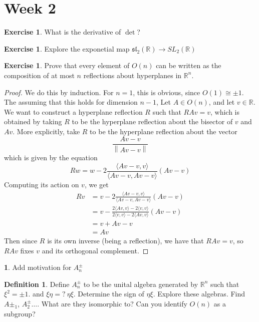 \documentclass[psamsfonts]{amsart}
\theoremstyle{definition}
\newtheorem{defn}[thm]{Definition}
\newtheorem{exer}[thm]{Exercise}
\newtheorem*{TODO}{\ib{TODO}}
\theoremstyle{remark}
\newcommand{\R}{\mathbb{R}}
\newcommand{\ib}[1]{\textbf{\textit{#1}}}
\newcommand{\norm}[1]{\left\lVert#1\right\rVert}
\begin{document}
\section*{Week 2}
\begin{exer}
What is the derivative of $\det$?
\end{exer}
%
\begin{exer}
Explore the exponetial map $\mathfrak{sl}_2(\R) \to SL_2(\R)$
\end{exer}
%
\begin{exer}
Prove that every element of $O(n)$ can be written as the composition of at most $n$ reflections about hyperplanes in $\R^n$.
\end{exer}
%
\begin{proof}
We do this by induction. For $n = 1$, this is obvious, since $O(1) \cong \pm 1$. The assuming that this holds for dimension $n-1$, Let $A \in O(n)$, and let $v \in \R$. We want to construct a hyperplane reflection $R$ such that $RAv = v$, which is obtained by taking $R$ to be the hyperplane reflection about the bisector of $v$ and $Av$. More explicitly, take $R$ to be the hyperplane reflection about the vector 
$$\frac{Av - v}{\norm{Av - v}} $$
which is given by the equation
$$Rw = w - 2 \frac{\langle Av - v, v \rangle}{\langle Av - v, Av - v \rangle}(Av - v) $$
Computing its action on $v$, we get 
\begin{align*}
Rv &= v - 2 \frac{\langle Av - v, v \rangle}{\langle Av - v, Av - v \rangle}(Av - v) \\
&= v - \frac{2\langle Av, v \rangle - 2\langle v, v \rangle}{2 \langle v, v \rangle - 2 \langle Av, v \rangle}(Av - v) \\
&= v + Av -v \\
&= Av
\end{align*}
Then since $R$ is its own inverse (being a reflection), we have that $RAv = v$, so $RAv$ fixes $v$ and its orthogonal complement.
\end{proof}
%
\begin{TODO}
Add motivation for $A^\pm_n$
\end{TODO}
%
\begin{defn}
Define $A^\pm_n$ to be the unital algebra generated by $\R^n$ such that $\xi^2 = \pm 1$. and $\xi\eta = ?~\eta\xi$. Determine the sign of $\eta\xi$. Explore these algebras. Find $A\pm_1$, $A^\pm_2 \ldots$. What are they isomorphic to? Can you identify $O(n)$ as a subgroup?
\end{defn}
%
\setcounter{section}{3}
%
\setcounter{thm}{0}
%
\end{document}
